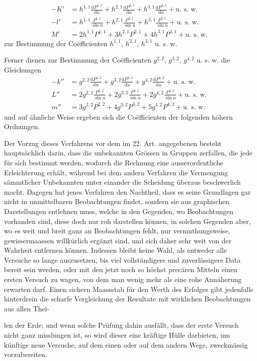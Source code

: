 \par\clearpage
{}
\[
\begin{aligned}
-K'&=h^{1,1}\frac{\mathrm{d}P^{1,1}}{\mathrm{d}u}+h^{2,1}\frac{\mathrm{d}P^{2,1}}{\mathrm{d}u}+h^{3,1}\frac{\mathrm{d}P^{3,1}}{\mathrm{d}u}+\text{u. s. w.}\\
-l'&=h^{1,1}\frac{P^{1,1}}{\sin u}+h^{2,1}\frac{P^{2,1}}{\sin u}+h^{3,1}\frac{P^{3,1}}{\sin u}+\text{u. s. w.}\\
M'&=2h^{1,1}P^{1,1}+3h^{2,1}P^{2,1}+4h^{3,1}P^{3,1}+\text{u. s. w.}
\end{aligned}
\]
zur Bestimmung der Coëfficienten $h^{1,1}$, $h^{2,1}$, $h^{3,1}$ u. s. w.

Ferner dienen zur Bestimmung der Coëfficienten $g^{2,2}$, $g^{3,2}$, $g^{4,2}$ u. s. w. die Gleichungen
\[
\begin{aligned}
-k''&=g^{2,2}\frac{\mathrm{d}P^{2,2}}{\mathrm{d}u}+g^{3,2}\frac{\mathrm{d}P^{3,2}}{\mathrm{d}u}+g^{4,2}\frac{\mathrm{d}P^{4,2}}{\mathrm{d}u}+\text{u. s. w.}\\
L''&=2g^{2,2}\frac{P^{2,2}}{\sin u}+2g^{3,2}\frac{P^{3,2}}{\sin u}+2g^{4,2}\frac{P^{4,2}}{\sin u}+\text{u. s. w.}\\
m''&=3g^{2,2}P^{2,2}+4g^{3,2}P^{3,2}+5g^{4,2}P^{4,2}+\text{u. s. w.}
\end{aligned}
\]
und auf ähnliche Weise ergeben sich die Coëfficienten der folgenden höhern Ordnungen.

Der Vorzug dieses Verfahrens vor dem im 22. Art. angegebenen besteht hauptsächlich darin, dass die unbekannten Grössen in Gruppen zerfallen, die jede für sich bestimmt werden, wodurch die Rechnung eine ausserordentliche Erleichterung erhält, während bei dem andern Verfahren die Vermengung sämmtlicher Unbekannten unter einander die Scheidung überaus beschwerlich macht. Dagegen hat jenes Verfahren den Nachtheil, dass es seine Grundlagen gar nicht in unmittelbaren Beobachtungen findet, sondern sie aus graphischen Darstellungen entlehnen muss, welche in den Gegenden, wo Beobachtungen vorhanden sind, diese doch nur roh darstellen können, in solchen Gegenden aber, wo es weit und breit ganz an Beobachtungen fehlt, nur vermuthungsweise, gewissermaassen willkürlich ergänzt sind, und sich daher sehr weit von der Wahrheit entfernen können. Indessen bleibt keine Wahl, als entweder alle Versuche so lange auszusetzen, bis viel vollständigere und zuverlässigere Data bereit sein werden, oder mit den jetzt noch so höchst precären Mitteln einen ersten Versuch zu wagen, von dem man wenig mehr als eine rohe Annäherung erwarten darf. Einen sichern Maassstab für den Werth des Erfolges gibt jedenfalls hinterdrein die scharfe Vergleichung der Resultate mit wirklichen Beobachtungen aus allen Thei-
\par\clearpage
{}
\noindent len der Erde; und wenn solche Prüfung dahin ausfällt, dass der erste Versuch nicht ganz misslungen ist, so wird dieser eine kräftige Hülfe darbieten, um künftige neue Versuche, auf dem einen oder auf dem andern Wege, zweckmässig vorzubereiten.


